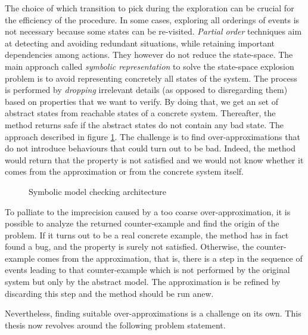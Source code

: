 The choice of which transition to pick during the exploration can be
crucial for the efficiency of the procedure. In some cases, exploring all orderings of events is not necessary because some states can be re-visited. \emph{Partial order} techniques aim at detecting and avoiding
redundant situations, while retaining important dependencies among
actions. They however do not reduce the state-space. The main approach called \emph{symbolic
  representation}  to solve the state-space explosion problem is to avoid representing concretely all states of the system. The process is performed by \emph{dropping} irrelevant
details (as opposed to disregarding them) based on properties that we want to verify. By doing that, we get an set of abstract states from reachable states of a concrete system. Thereafter, the method returns safe if the abstract states do not contain any bad state. The approach described in figure \ref{symbolicmodelchecking}.  %
%
The challenge is to find over-approximations that do not introduce
behaviours that could turn out to be bad. Indeed, the method would
return that the property is not satisfied and we would not know
whether it comes from the approximation or from the concrete system
itself. %
                                   


\vspace{1cm}
\begin{figure}[h]
  \centering
  \vspace{0.3cm}
\caption{Symbolic model checking architecture }	
\label{symbolicmodelchecking}
\end{figure}
\vspace{1cm}

To palliate to the imprecision caused by a too coarse
over-approximation, it is possible to analyze the returned
counter-example and find the origin of the problem. If it turns out to
be a real concrete example, the method has in fact found a bug, and
the property is surely not satisfied. Otherwise, the counter-example
comes from the approximation, that is, there is a step in the sequence
of events leading to that counter-example which is not performed by
the original system but only by the abstract model. The approximation
is be refined by discarding this step and the method should be run
anew.

Nevertheless, finding suitable over-approximations is a challenge on
its own. %
This thesis now revolves around the following problem statement.
%
%
